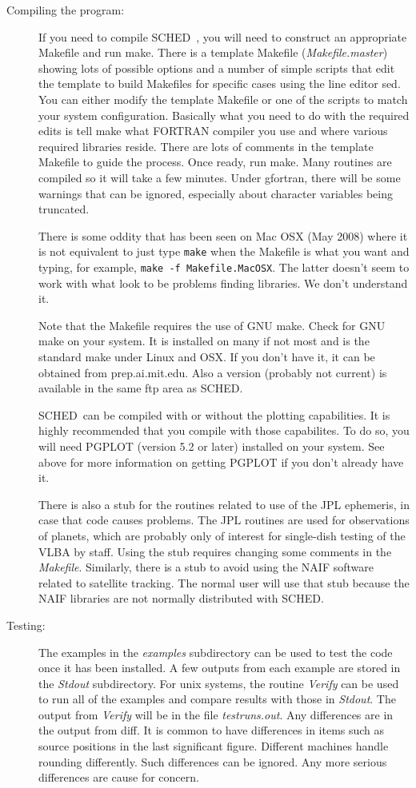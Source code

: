 \documentclass{report}
\newcommand{\sched}{{\sc SCHED}}
\newcommand{\schedb}{{\sc SCHED~}}
\begin{document}
\begin{description}
\item [Compiling the program:] If you need to compile \schedb, you
will need to construct an appropriate Makefile and run make.  There is
a template Makefile ({\sl Makefile.master}) showing lots of possible
options and a number of simple scripts that edit the template to build
Makefiles for specific cases using the line editor sed.  You can
either modify the template Makefile or one of the scripts to match
your system configuration.  Basically what you need to do with the
required edits is tell make what FORTRAN compiler you use and where
various required libraries reside.  There are lots of comments in the
template Makefile to guide the process.  Once ready, run make.  Many
routines are compiled so it will take a few minutes.  Under gfortran,
there will be some warnings that can be ignored, especially about
character variables being truncated.

There is some oddity that has been seen on Mac OSX (May 2008) where it
is not equivalent to just type {\tt make} when the Makefile is what
you want and typing, for example, {\tt make -f Makefile.MacOSX}.  The
latter doesn't seem to work with what look to be problems finding
libraries.  We don't understand it.

Note that the Makefile requires the use of GNU make.  Check for GNU
make on your system.  It is installed on many if not most and is the
standard make under Linux and OSX.  If you don't have it, it can be
obtained from prep.ai.mit.edu.  Also a version (probably not current)
is available in the same ftp area as \sched.

\schedb can be compiled with or without the plotting capabilities.  It
is highly recommended that you compile with those capabilites.  To do
so, you will need {\sc PGPLOT} (version 5.2 or later) installed on
your system.  See above for more information on getting {\sc PGPLOT}
if you don't already have it.

There is also a stub for the routines related to use of the JPL
ephemeris, in case that code causes problems.  The JPL routines are
used for observations of planets, which are probably only of interest
for single-dish testing of the VLBA by staff.  Using the stub requires
changing some comments in the {\sl Makefile}.  Similarly, there is
a stub to avoid using the NAIF software related to satellite tracking.
The normal user will use that stub because the NAIF libraries are not
normally distributed with \sched.

\item [Testing:] The examples in the {\sl examples} subdirectory can
be used to test the code once it has been installed.  A few outputs
from each example are stored in the {\sl Stdout} subdirectory.  For
unix systems, the routine {\sl Verify} can be used to run all of the
examples and compare results with those in {\sl Stdout}.  The output
from {\sl Verify} will be in the file {\sl testruns.out}.  Any
differences are in the output from diff.  It is common to have
differences in items such as source positions in the last significant
figure.  Different machines handle rounding differently.  Such
differences can be ignored.  Any more serious differences are cause
for concern.


\end{description}
\end{document}
